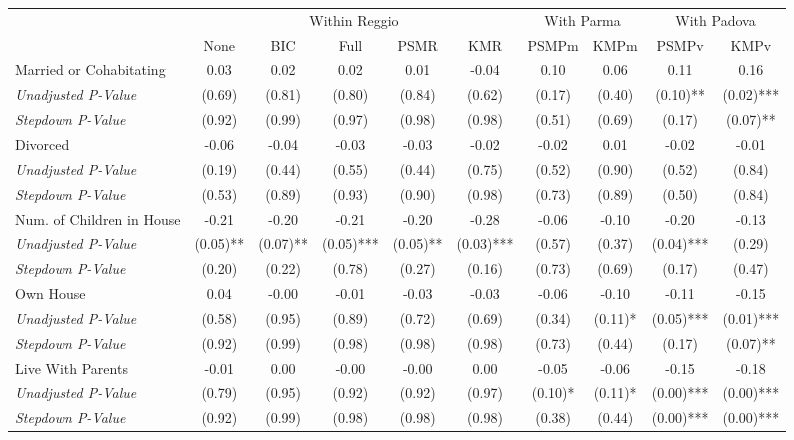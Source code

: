 \begin{tabular}{l c c c c c c c c c}
\toprule
& \multicolumn{5}{c}{Within Reggio} & \multicolumn{2}{c}{With Parma} & \multicolumn{2}{c}{With Padova} \\\cmidrule(lr){2-6} \cmidrule(lr){7-8} \cmidrule(lr){9-10}
 & None & BIC & Full & PSMR & KMR & PSMPm & KMPm & PSMPv & KMPv \\
\midrule
Married or Cohabitating & 0.03 & 0.02 & 0.02 & 0.01 & -0.04 & 0.10 & 0.06 & 0.11 & 0.16 \\
\quad \textit{Unadjusted P-Value} & (0.69) & (0.81) & (0.80) & (0.84) & (0.62) & (0.17) & (0.40) & (0.10)** & (0.02)*** \\
\quad \textit{Stepdown P-Value} & (0.92) & (0.99) & (0.97) & (0.98) & (0.98) & (0.51) & (0.69) & (0.17) & (0.07)** \\
Divorced & -0.06 & -0.04 & -0.03 & -0.03 & -0.02 & -0.02 & 0.01 & -0.02 & -0.01 \\
\quad \textit{Unadjusted P-Value} & (0.19) & (0.44) & (0.55) & (0.44) & (0.75) & (0.52) & (0.90) & (0.52) & (0.84) \\
\quad \textit{Stepdown P-Value} & (0.53) & (0.89) & (0.93) & (0.90) & (0.98) & (0.73) & (0.89) & (0.50) & (0.84) \\
Num. of Children in House & -0.21 & -0.20 & -0.21 & -0.20 & -0.28 & -0.06 & -0.10 & -0.20 & -0.13 \\
\quad \textit{Unadjusted P-Value} & (0.05)** & (0.07)** & (0.05)*** & (0.05)** & (0.03)*** & (0.57) & (0.37) & (0.04)*** & (0.29) \\
\quad \textit{Stepdown P-Value} & (0.20) & (0.22) & (0.78) & (0.27) & (0.16) & (0.73) & (0.69) & (0.17) & (0.47) \\
Own House & 0.04 & -0.00 & -0.01 & -0.03 & -0.03 & -0.06 & -0.10 & -0.11 & -0.15 \\
\quad \textit{Unadjusted P-Value} & (0.58) & (0.95) & (0.89) & (0.72) & (0.69) & (0.34) & (0.11)* & (0.05)*** & (0.01)*** \\
\quad \textit{Stepdown P-Value} & (0.92) & (0.99) & (0.98) & (0.98) & (0.98) & (0.73) & (0.44) & (0.17) & (0.07)** \\
Live With Parents & -0.01 & 0.00 & -0.00 & -0.00 & 0.00 & -0.05 & -0.06 & -0.15 & -0.18 \\
\quad \textit{Unadjusted P-Value} & (0.79) & (0.95) & (0.92) & (0.92) & (0.97) & (0.10)* & (0.11)* & (0.00)*** & (0.00)*** \\
\quad \textit{Stepdown P-Value} & (0.92) & (0.99) & (0.98) & (0.98) & (0.98) & (0.38) & (0.44) & (0.00)*** & (0.00)*** \\
\bottomrule
\end{tabular}
